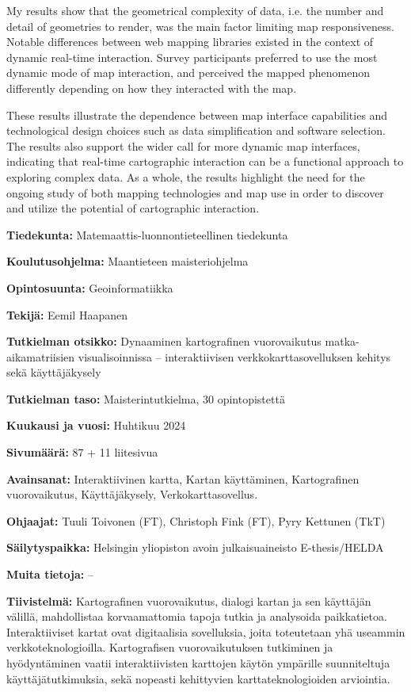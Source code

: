 \begin{spacing}{1}
My results show that the geometrical complexity of data,
i.e. the number and detail of geometries to render,
was the main factor limiting map responsiveness.
Notable differences between web mapping libraries existed
in the context of dynamic real-time interaction.
Survey participants preferred to use the most dynamic mode of map interaction,
and perceived the mapped phenomenon differently depending on how they interacted with the map.

These results illustrate the dependence between map interface capabilities and technological design choices
such as data simplification and software selection.
The results also support the wider call for more dynamic map interfaces,
indicating that real-time cartographic interaction can be a functional approach to exploring complex data.
As a whole, the results highlight the need for the ongoing study of both mapping technologies and map use
in order to discover and utilize the potential of cartographic interaction.

\newpage

\textbf{Tiedekunta:} Matemaattis-luonnontieteellinen tiedekunta

\textbf{Koulutusohjelma:} Maantieteen maisteriohjelma

\textbf{Opintosuunta:} Geoinformatiikka

\textbf{Tekijä:} Eemil Haapanen

\textbf{Tutkielman otsikko:}
Dynaaminen kartografinen vuorovaikutus matka-aikamatriisien visualisoinnissa --
interaktiivisen verkkokarttasovelluksen kehitys sekä käyttäjäkysely

\textbf{Tutkielman taso:} Maisterintutkielma, 30 opintopistettä

\textbf{Kuukausi ja vuosi:} Huhtikuu 2024  %

\textbf{Sivumäärä:} 87 + 11 liitesivua  %

\textbf{Avainsanat:}
Interaktiivinen kartta,
Kartan käyttäminen,
Kartografinen vuorovaikutus,
Käyttäjäkysely,
Verkokarttasovellus.

\textbf{Ohjaajat:} Tuuli Toivonen (FT), Christoph Fink (FT), Pyry Kettunen (TkT)

\textbf{Säilytyspaikka:} Helsingin yliopiston avoin julkaisuaineisto E-thesis/HELDA

\textbf{Muita tietoja:} --

\textbf{Tiivistelmä:}
Kartografinen vuorovaikutus, dialogi kartan ja sen käyttäjän välillä, mahdollistaa
korvaamattomia tapoja tutkia ja analysoida paikkatietoa.
Interaktiiviset kartat ovat digitaalisia sovelluksia,
joita toteutetaan yhä useammin verkkoteknologioilla.
Kartografisen vuorovaikutuksen tutkiminen ja hyödyntäminen vaatii
interaktiivisten karttojen käytön ympärille suunniteltuja käyttäjätutkimuksia,
sekä nopeasti kehittyvien karttateknologioiden arviointia.


\end{spacing}
